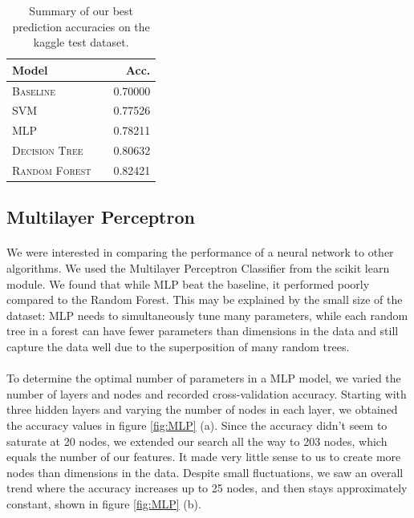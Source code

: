 \documentclass[11pt]{article}
\begin{document}
  \begin{table}
\centering
\begin{tabular}{llr}
 \toprule
 Model &  & Acc. \\
 \midrule
 \textsc{Baseline} & & 0.70000\\
 \textsc{SVM} & & 0.77526 \\
 \textsc{MLP} & & 0.78211 \\
 \textsc{Decision Tree} & & 0.80632\\
  \textsc{Random Forest} & &0.82421\\
 \bottomrule
\end{tabular}
\caption{\label{tab:results} Summary of our best prediction accuracies on the kaggle test dataset.}
\end{table}

\subsection{Multilayer Perceptron}
\paragraph{}We were interested in comparing the performance of a neural network to other algorithms. We used the Multilayer Perceptron Classifier from the scikit learn module. We found that while MLP beat the baseline, it performed poorly compared to the Random Forest. This may be explained by the small size of the dataset: MLP needs to simultaneously tune many parameters, while each random tree in a forest can have fewer parameters than dimensions in the data and still capture the data well due to the superposition of many random trees.

\paragraph{}To determine the optimal number of parameters in a MLP model, we varied the number of layers and nodes and recorded cross-validation accuracy. Starting with three hidden layers and varying the number of nodes in each layer, we obtained the accuracy values in figure \ref{fig:MLP} (a). Since the accuracy didn't seem to saturate at 20 nodes, we extended our search all the way to 203 nodes, which equals the number of our features. It made very little sense to us to create more nodes than dimensions in the data. Despite small fluctuations, we saw an overall trend where the accuracy increases up to 25 nodes, and then stays approximately constant, shown in figure \ref{fig:MLP} (b). 
\end{document}
